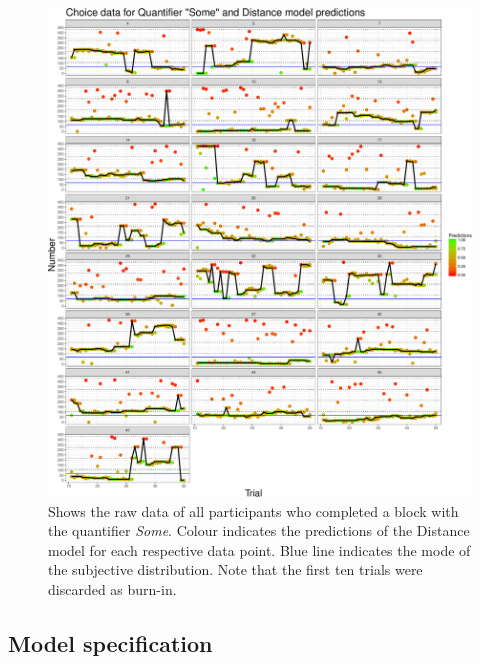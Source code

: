 \documentclass[english,floatsintext,man]{apa6}
\begin{document}
\begin{figure}[htbp]
\centering
\includegraphics{manuscript_files/figure-latex/unnamed-chunk-6-1.pdf}
\caption{\label{fig:unnamed-chunk-6}Shows the raw data of all participants
who completed a block with the quantifier \emph{Some}. Colour indicates
the predictions of the Distance model for each respective data point.
Blue line indicates the mode of the subjective distribution. Note that
the first ten trials were discarded as burn-in.}
\end{figure}

\subsection{Model specification}\label{model-specification}
\end{document}
